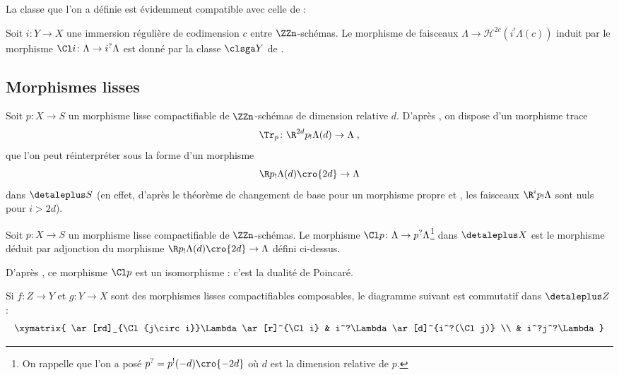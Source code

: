 \documentclass[10pt]{../fichiers-configuration-latex/smfart}
\begin{document}
\bigskip

La classe que l'on a définie est évidemment compatible avec celle de
 :

\begin{proposition2}\label{16-proposition-compatibilite-sga-quatre-et-demi}
Soit $i\colon Y\to X$ une immersion régulière de codimension $c$
entre $\ZZn$-schémas.
Le morphisme de faisceaux $\Lambda\to {\mathscr H}^{2c}(i^!\Lambda(c))$
induit par le morphisme $\Cl i\colon \Lambda\to i^?\Lambda$ 
est donné par la classe $\clsga Y$ de .
\end{proposition2}

\subsection{Morphismes lisses}%

Soit $p\colon X\to S$ un morphisme lisse compactifiable
de $\ZZn$-schémas de dimension
relative $d$. D'après
, on dispose d'un morphisme trace
\[\Tr_p\colon \R^{2d}p_!\Lambda(d)\to \Lambda\;\text{,}\]
que l'on peut réinterpréter sous la forme d'un morphisme
\[\R p_!\Lambda(d)\cro{2d}\to \Lambda\]
dans $\detaleplus S$ (en effet, d'après le théorème de changement de base pour un
morphisme propre et , les faisceaux $\R^ip_!\Lambda$
sont nuls pour $i>2d$). 

\begin{definition2}\label{16-definition-cl-p}
Soit $p\colon X\to S$ un morphisme lisse compactifiable
de $\ZZn$-schémas. Le morphisme 
$\Cl p\colon \Lambda\to p^?\Lambda$\;\footnote{On rappelle que l'on a posé
$p^?=p^!(-d)\cro{-2d}$ où $d$ est la dimension relative de $p$.}
dans $\detaleplus X$ est le morphisme déduit
par adjonction du morphisme $\R p_!\Lambda(d)\cro{2d}\to\Lambda$
défini ci-dessus.
\end{definition2}

D'après , ce morphisme $\Cl p$ est un isomorphisme :
c'est la dualité de Poincaré.

\begin{proposition2}\label{16-proposition-composition-cl-lisses}
Si $f\colon Z\to Y$ et $g\colon Y\to X$ sont des morphismes lisses
compactifiables composables, le diagramme suivant
est commutatif dans $\detaleplus Z$ :
\[
\xymatrix{
\ar[rd]_{\Cl {j\circ i}}\Lambda\ar[r]^{\Cl i}  &
   i^?\Lambda \ar[d]^{i^?(\Cl j)} \\
&   i^?j^?\Lambda}
\]
\end{proposition2}
\end{document}

